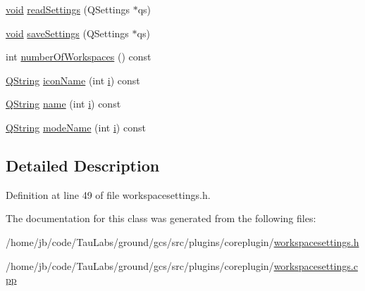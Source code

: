\begin{DoxyCompactItemize}
\item 
\hyperlink{group___u_a_v_objects_plugin_ga444cf2ff3f0ecbe028adce838d373f5c}{void} \hyperlink{group___core_plugin_ga0079ab041ae768fb765979fa21b4f492}{read\-Settings} (\-Q\-Settings $\ast$qs)
\item 
\hyperlink{group___u_a_v_objects_plugin_ga444cf2ff3f0ecbe028adce838d373f5c}{void} \hyperlink{group___core_plugin_ga1b31a14b266c4c7510783a9cf8e7fc8c}{save\-Settings} (\-Q\-Settings $\ast$qs)
\item 
int \hyperlink{group___core_plugin_ga46a6c14d88c85a5ef0b125638b90141e}{number\-Of\-Workspaces} () const 
\item 
\hyperlink{group___u_a_v_objects_plugin_gab9d252f49c333c94a72f97ce3105a32d}{\-Q\-String} \hyperlink{group___core_plugin_ga192b99d6e0131b46373653b9062fc396}{icon\-Name} (int \hyperlink{uavobjecttemplate_8m_a6f6ccfcf58b31cb6412107d9d5281426}{i}) const 
\item 
\hyperlink{group___u_a_v_objects_plugin_gab9d252f49c333c94a72f97ce3105a32d}{\-Q\-String} \hyperlink{group___core_plugin_gaca9adc4c2ff0dc7f6537d248d9ed99c1}{name} (int \hyperlink{uavobjecttemplate_8m_a6f6ccfcf58b31cb6412107d9d5281426}{i}) const 
\item 
\hyperlink{group___u_a_v_objects_plugin_gab9d252f49c333c94a72f97ce3105a32d}{\-Q\-String} \hyperlink{group___core_plugin_gac647d36361c035d0534bf2a6f52bbcdd}{mode\-Name} (int \hyperlink{uavobjecttemplate_8m_a6f6ccfcf58b31cb6412107d9d5281426}{i}) const 
\end{DoxyCompactItemize}


\subsection{\-Detailed \-Description}


\-Definition at line 49 of file workspacesettings.\-h.



\-The documentation for this class was generated from the following files\-:\begin{DoxyCompactItemize}
\item 
/home/jb/code/\-Tau\-Labs/ground/gcs/src/plugins/coreplugin/\hyperlink{workspacesettings_8h}{workspacesettings.\-h}\item 
/home/jb/code/\-Tau\-Labs/ground/gcs/src/plugins/coreplugin/\hyperlink{workspacesettings_8cpp}{workspacesettings.\-cpp}\end{DoxyCompactItemize}
